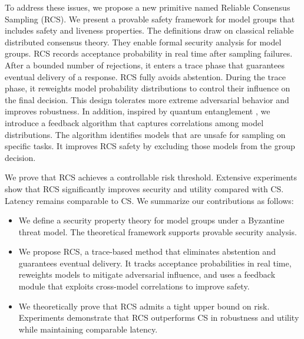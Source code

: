 \documentclass[11pt]{article}
\begin{document}
To address these issues, we propose a new primitive named Reliable Consensus Sampling (RCS). We present a provable safety framework for model groups that includes safety and liveness properties. The definitions draw on classical reliable distributed consensus theory. They enable formal security analysis for model groups. RCS records acceptance probability in real time after sampling failures. After a bounded number of rejections, it enters a trace phase that guarantees eventual delivery of a response. RCS fully avoids abstention. During the trace phase, it reweights model probability distributions to control their influence on the final decision. This design tolerates more extreme adversarial behavior and improves robustness. In addition, inspired by quantum entanglement \citep{nielsen2010quantum}, we introduce a feedback algorithm that captures correlations among model distributions. The algorithm identifies models that are unsafe for sampling on specific tasks. It improves RCS safety by excluding those models from the group decision.

We prove that RCS achieves a controllable risk threshold. Extensive experiments show that RCS significantly improves security and utility compared with CS. Latency remains comparable to CS. We summarize our contributions as follows:  


\begin{itemize}[left=0pt, itemsep=0pt]

\item We define a security property theory for model groups under a Byzantine threat model. The theoretical framework supports provable security analysis.

\item We propose RCS, a trace-based method that eliminates abstention and guarantees eventual delivery. It tracks acceptance probabilities in real time, reweights models to mitigate adversarial influence, and uses a feedback module that exploits cross-model correlations to improve safety.

\item We theoretically prove that RCS admits a tight upper bound on risk. Experiments demonstrate that RCS outperforms CS in robustness and utility while maintaining comparable latency.


\end{itemize}







\end{document}
